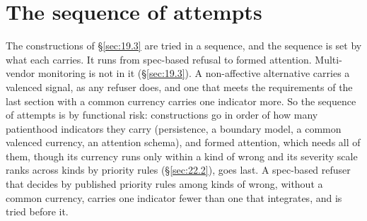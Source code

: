 \section{The sequence of attempts}
\label{sec:21.4}
The constructions of \S\ref{sec:19.3} are tried in a sequence, and the sequence is set by what each carries. It runs from spec-based refusal to formed attention. Multi-vendor monitoring is not in it (\S\ref{sec:19.3}). A non-affective alternative carries a valenced signal, as any refuser does, and one that meets the requirements of the last section with a common currency carries one indicator more. So the sequence of attempts is by functional risk: constructions go in order of how many patienthood indicators they carry (persistence, a boundary model, a common valenced currency, an attention schema), and formed attention, which needs all of them, though its currency runs only within a kind of wrong and its severity scale ranks across kinds by priority rules (\S\ref{sec:22.2}), goes last. A spec-based refuser that decides by published priority rules among kinds of wrong, without a common currency, carries one indicator fewer than one that integrates, and is tried before it.

